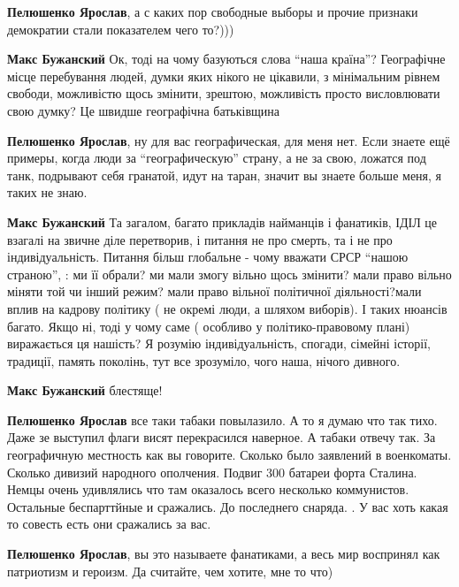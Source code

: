 \begin{itemize}
\begin{itemize}
\begin{itemize}
\textbf{Пелюшенко Ярослав}, а с каких пор свободные выборы и прочие признаки демократии стали показателем чего то?)))

\textbf{Макс Бужанский} Ок, тоді на чому базуються слова \enquote{наша країна}?
Географічне місце перебування людей, думки яких нікого не цікавили, з
мінімальним рівнем свободи, можливістю щось змінити, зрештою, можливість просто
висловлювати свою думку? Це швидше географічна батьківщина

\textbf{Пелюшенко Ярослав}, ну для вас географическая, для меня нет.
Если знаете ещё примеры, когда люди за \enquote{географическую} страну, а не за свою,
ложатся под танк, подрывают себя гранатой, идут на таран, значит вы знаете
больше меня, я таких не знаю.


\textbf{Макс Бужанский} Та загалом, багато прикладів найманців і фанатиків,
ІДІЛ це взагалі на звичне діле перетворив, і питання не про смерть, та і не про
індивідуальність. Питання більш глобальне - чому вважати СРСР \enquote{нашою страною},
: ми її обрали? ми мали змогу вільно щось змінити? мали право вільно міняти той
чи інший режим? мали право вільної політичної діяльності?мали вплив на кадрову
політику ( не окремі люди, а шляхом виборів). І таких нюансів багато. Якщо ні,
тоді у чому саме ( особливо у політико-правовому плані) виражається ця нашість?
Я розумію індивідуальність, спогади, сімейні історії, традиції, память
поколінь, тут все зрозуміло, чого наша, нічого дивного.


\textbf{Макс Бужанский} блестяще!


\textbf{Пелюшенко Ярослав} все таки табаки повылазило.
А то я думаю что так тихо. Даже зе выступил флаги висят перекрасился наверное.
А табаки отвечу так. За географичную местность как вы говорите. Сколько было
заявлений в военкоматы. Сколько дивизий народного ополчения. Подвиг 300 батареи
форта Сталина. Немцы очень удивлялись что там оказалось всего несколько
коммунистов. Остальные беспарттйные и сражались. До последнего снаряда. . У вас
хоть какая то совесть есть они сражались за вас.

\textbf{Пелюшенко Ярослав}, вы это называете фанатиками, а весь мир воспринял как патриотизм и героизм.
Да считайте, чем хотите, мне то что)


\end{itemize}
\end{itemize}
\end{itemize}
